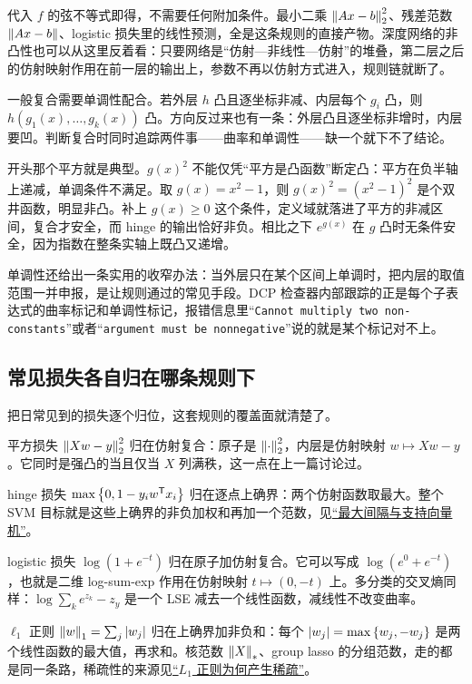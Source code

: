 代入 \(f\) 的弦不等式即得，不需要任何附加条件。最小二乘 \(\left\lVert Ax-b\right\rVert_2^2\)、残差范数 \(\left\lVert Ax-b\right\rVert\)、logistic 损失里的线性预测，全是这条规则的直接产物。深度网络的非凸性也可以从这里反着看：只要网络是``仿射—非线性—仿射''的堆叠，第二层之后的仿射映射作用在前一层的输出上，参数不再以仿射方式进入，规则链就断了。

一般复合需要单调性配合。若外层 \(h\) 凸且逐坐标非减、内层每个 \(g_i\) 凸，则 \(h(g_1(x),\ldots,g_k(x))\) 凸。方向反过来也有一条：外层凸且逐坐标非增时，内层要凹。判断复合时同时追踪两件事——曲率和单调性——缺一个就下不了结论。

开头那个平方就是典型。\(g(x)^2\) 不能仅凭``平方是凸函数''断定凸：平方在负半轴上递减，单调条件不满足。取 \(g(x)=x^2-1\)，则 \(g(x)^2=(x^2-1)^2\) 是个双井函数，明显非凸。补上 \(g(x)\ge0\) 这个条件，定义域就落进了平方的非减区间，复合才安全，而 hinge 的输出恰好非负。相比之下 \(e^{g(x)}\) 在 \(g\) 凸时无条件安全，因为指数在整条实轴上既凸又递增。

单调性还给出一条实用的收窄办法：当外层只在某个区间上单调时，把内层的取值范围一并申报，是让规则通过的常见手段。DCP 检查器内部跟踪的正是每个子表达式的曲率标记和单调性标记，报错信息里``\texttt{Cannot multiply two non-constants}''或者``\texttt{argument must be nonnegative}''说的就是某个标记对不上。

\subsection{常见损失各自归在哪条规则下}

把日常见到的损失逐个归位，这套规则的覆盖面就清楚了。

平方损失 \(\left\lVert Xw-y\right\rVert_2^2\) 归在仿射复合：原子是 \(\left\lVert\cdot\right\rVert_2^2\)，内层是仿射映射 \(w\mapsto Xw-y\)。它同时是强凸的当且仅当 \(X\) 列满秩，这一点在上一篇讨论过。

hinge 损失 \(\max\left\{0,1-y_iw^{\mathsf{T}}x_i\right\}\) 归在逐点上确界：两个仿射函数取最大。整个 SVM 目标就是这些上确界的非负加权和再加一个范数，见\hyperref[sec:09-Convex-Optimization/07-Applications/03]{``最大间隔与支持向量机''}。

logistic 损失 \(\log(1+e^{-t})\) 归在原子加仿射复合。它可以写成 \(\log(e^0+e^{-t})\)，也就是二维 log-sum-exp 作用在仿射映射 \(t\mapsto(0,-t)\) 上。多分类的交叉熵同样：\(\log\sum_ke^{z_k}-z_y\) 是一个 LSE 减去一个线性函数，减线性不改变曲率。

\(\ell_1\) 正则 \(\left\lVert w\right\rVert_1=\sum_j\left|w_j\right|\) 归在上确界加非负和：每个 \(\left|w_j\right|=\max\left\{w_j,-w_j\right\}\) 是两个线性函数的最大值，再求和。核范数 \(\left\lVert X\right\rVert_*\)、group lasso 的分组范数，走的都是同一条路，稀疏性的来源见\hyperref[sec:09-Convex-Optimization/07-Applications/02]{``\(L_1\) 正则为何产生稀疏''}。

